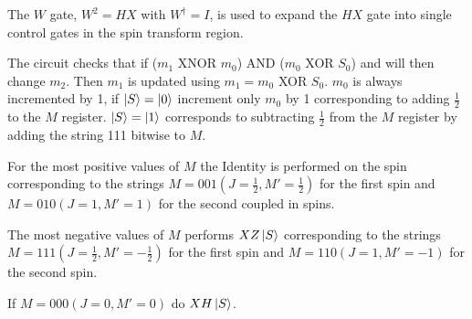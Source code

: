 \documentclass[landscape, 12pt]{article}
\begin{document}
The $W$ gate, $W^2 = HX$ with $W^{\dag} = I$, is used to expand the $HX$ gate into single control gates in the spin transform region. 

The circuit checks that if ($m_1$ XNOR $m_0$) AND ($m_0$ XOR $S_0$) and will then change $m_2$. Then $m_1$ is updated using $m_1 = m_0$ XOR $S_0$. $m_0$ is always incremented by 1, if $\left\vert{S}\right\rangle = \left\vert{0}\right\rangle$ increment only $m_0$ by 1 corresponding to adding $\frac{1}{2}$ to the $M$ register. $\left\vert{S}\right\rangle = \left\vert{1}\right\rangle$ corresponds to subtracting $\frac{1}{2}$ from the $M$ register by adding the string 111 bitwise to $M$. 
 
For the most positive values of $M$ the Identity is performed on the spin corresponding to the strings $M=001 (J=\frac{1}{2}, M' = \frac{1}{2})$ for the first spin and $M=010 (J=1, M'=1) $ for the second coupled in spins. 

The most negative values of $M$ performs $XZ \left\vert{S}\right\rangle$ corresponding to the strings $M=111 (J=\frac{1}{2}, M'=-\frac{1}{2})$ for the first spin and $M=110 (J=1, M'=-1)$ for the second spin.

If $M=000 (J=0, M'=0)$ do $XH \left\vert{S}\right\rangle$.  


\newpage
\end{document}
